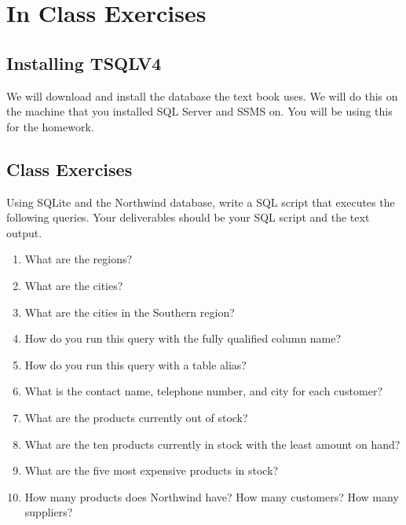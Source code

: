 \documentclass{article}
\begin{document}
    \section{In Class Exercises}

    \subsection{Installing TSQLV4}

    We will download and install the database the text book uses. We will do this on the machine that you installed SQL Server and SSMS on. You will be using this for the homework.

    \subsection{Class Exercises}

Using SQLite and the Northwind database, write a SQL script that executes the following queries. Your deliverables should be your SQL script and the text output.

        \begin{enumerate}
            \item What are the regions?
            \item What are the cities?
            \item What are the cities in the Southern region?
            \item How do you run this query with the fully qualified column name?
            \item How do you run this query with a table alias?
            \item What is the contact name, telephone number, and city for each customer?
            \item What are the products currently out of stock?
            \item What are the ten products currently in stock with the least amount on hand?
            \item What are the five most expensive products in stock?
            \item How many products does Northwind have? How many customers? How many suppliers?
        \end{enumerate}
        
\end{document}
